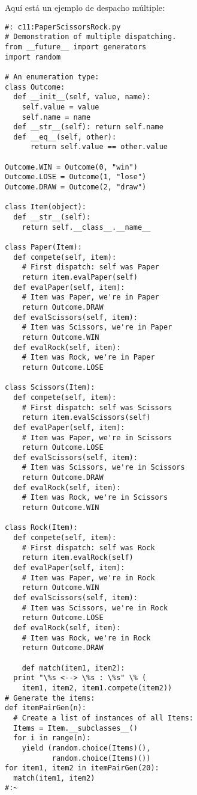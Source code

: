 Aquí está un ejemplo de despacho múltiple: \newline

\begin{lstlisting} 
#: c11:PaperScissorsRock.py 
# Demonstration of multiple dispatching. 
from __future__ import generators 
import random 

# An enumeration type: 
class Outcome: 
  def __init__(self, value, name):  
    self.value = value 
    self.name = name 
  def __str__(self): return self.name  
  def __eq__(self, other): 
      return self.value == other.value 
      
Outcome.WIN = Outcome(0, "win") 
Outcome.LOSE = Outcome(1, "lose") 
Outcome.DRAW = Outcome(2, "draw") 

class Item(object): 
  def __str__(self):  
    return self.__class__.__name__  
    
class Paper(Item): 
  def compete(self, item): 
    # First dispatch: self was Paper 
    return item.evalPaper(self) 
  def evalPaper(self, item): 
    # Item was Paper, we're in Paper 
    return Outcome.DRAW 
  def evalScissors(self, item): 
    # Item was Scissors, we're in Paper 
    return Outcome.WIN 
  def evalRock(self, item): 
    # Item was Rock, we're in Paper 
    return Outcome.LOSE 
    
class Scissors(Item): 
  def compete(self, item):  
    # First dispatch: self was Scissors 
    return item.evalScissors(self) 
  def evalPaper(self, item): 
    # Item was Paper, we're in Scissors 
    return Outcome.LOSE 
  def evalScissors(self, item): 
    # Item was Scissors, we're in Scissors 
    return Outcome.DRAW 
  def evalRock(self, item): 
    # Item was Rock, we're in Scissors 
    return Outcome.WIN 
    
class Rock(Item): 
  def compete(self, item): 
    # First dispatch: self was Rock 
    return item.evalRock(self) 
  def evalPaper(self, item): 
    # Item was Paper, we're in Rock 
    return Outcome.WIN 
  def evalScissors(self, item): 
    # Item was Scissors, we're in Rock 
    return Outcome.LOSE 
  def evalRock(self, item): 
    # Item was Rock, we're in Rock 
    return Outcome.DRAW 
    
    def match(item1, item2): 
  print "\%s <--> \%s : \%s" \% ( 
    item1, item2, item1.compete(item2)) 
# Generate the items: 
def itemPairGen(n): 
  # Create a list of instances of all Items: 
  Items = Item.__subclasses__() 
  for i in range(n): 
    yield (random.choice(Items)(),  
           random.choice(Items)()) 
for item1, item2 in itemPairGen(20): 
  match(item1, item2) 
#:~ 
\end{lstlisting}

